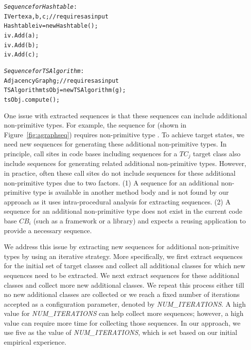 \documentclass{sig-alternate}
\begin{document}
\begin{CodeOut}
\begin{alltt}
\emph{Sequence for Hashtable}:
\hspace*{0.3in}IVertex a,b,c; //requires as input
\hspace*{0.3in}Hashtable iv = new Hashtable();
\hspace*{0.3in}iv.Add(a);
\hspace*{0.3in}iv.Add(b);
\hspace*{0.3in}iv.Add(c);

\emph{Sequence for TSAlgorithm}:
\hspace*{0.3in}AdjacencyGraph g; //requires as input
\hspace*{0.3in}TSAlgorithm tsObj = new TSAlgorithm(g);
\hspace*{0.3in}tsObj.compute();
\end{alltt}
\end{CodeOut}

One issue with extracted sequences is that these sequences can include additional non-primitive types. For example, the  sequence for  (shown in Figure~\ref{fig:agraphseq}) requires non-primitive type . To achieve target states, we need new sequences for generating these additional non-primitive types. In principle, call sites in code bases including sequences for a $TC_j$ target class also include sequences for generating related additional non-primitive types. However, in practice, often these call sites do not include sequences for these additional non-primitive types due to two factors. (1) A sequence for an additional non-primitive type is available in another method body and is not found by our approach as it uses intra-procedural analysis for extracting sequences.  (2) A sequence for an additional non-primitive type does not exist in the current code base $CB_i$ (such as a framework or a library) and expects a reusing application to provide a necessary sequence. 

We address this issue by extracting new sequences for additional non-primitive types by using an iterative strategy. More specifically, we first extract sequences for the initial set of target classes and collect all additional classes for which new sequences need to be extracted. We next extract sequences for these additional classes and collect more new additional classes. We repeat this process either till no new additional classes are collected or we reach a fixed number of iterations accepted as a configuration parameter, denoted by \emph{NUM\_ITERATIONS}. A high value for \emph{NUM\_ITERATIONS} can help collect more sequences; however, a high value can require more time for collecting those sequences. In our approach, we use five as the value of \emph{NUM\_ITERATIONS}, which is set based on our initial empirical experience.
\end{document}
